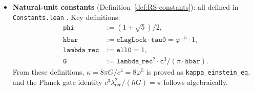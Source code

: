\documentclass[12pt]{article}
\theoremstyle{definition}
\theoremstyle{remark}
\begin{document}
\begin{itemize}
  \item \textbf{Natural-unit constants} (Definition~\ref{def:RS-constants}):
    all defined in \texttt{Constants.lean}
    \cite{WashburnLean4Repo2026}. Key definitions:
    \begin{align*}
      \texttt{phi} &:= (1 + \sqrt{5})/2, \\
      \texttt{hbar} &:= \texttt{cLagLock} \cdot \texttt{tau0}
        = \varphi^{-5} \cdot 1, \\
      \texttt{lambda\_rec} &:= \texttt{ell0} = 1, \\
      \texttt{G} &:= \texttt{lambda\_rec}^2
        \cdot \texttt{c}^3 / (\pi \cdot \texttt{hbar}).
    \end{align*}
    From these definitions,
    $\kappa = 8\pi G/c^4 = 8\varphi^5$ is proved as
    \texttt{kappa\_einstein\_eq}, and the Planck gate identity
    $c^3\lambda_{\mathrm{rec}}^2/(\hbar G) = \pi$
    follows algebraically.
\end{itemize}
\end{document}
